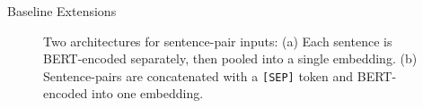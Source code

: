 \documentclass[final]{beamer}
\newlength{\colwidth}
\begin{document}
\begin{frame}[t]
\begin{columns}[t]
\begin{column}{\colwidth}
  \begin{block}{Baseline Extensions}
      \begin{figure}[h]%
          \centering
          \qquad
          \caption{Two architectures for sentence-pair inputs: 
          (a) Each sentence is BERT-encoded separately, then pooled into a single embedding.
          (b) Sentence-pairs are concatenated with a \texttt{[SEP]} token and BERT-encoded into 
          one embedding.
          }%
          \label{fig:example}%
      \end{figure}


\end{block}
\end{column}
\end{columns}
\end{frame}
\end{document}
